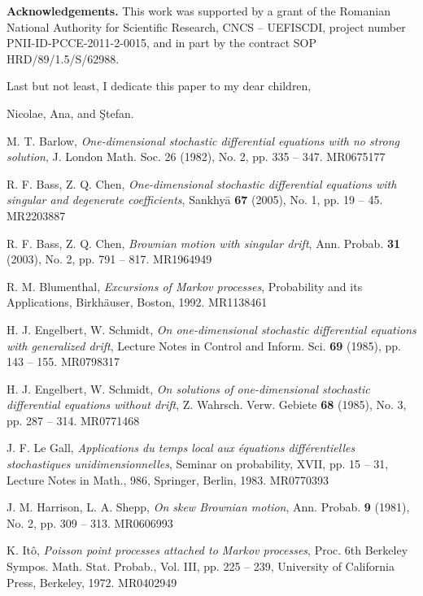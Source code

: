 \documentclass[reqno]{amsart}
\theoremstyle{definition}
\theoremstyle{remark}
\numberwithin{equation}{section}
\begin{document}
{\bf Acknowledgements.} This work was supported by a grant of the Romanian National Authority for Scientific Research, CNCS -- UEFISCDI, project number PNII-ID-PCCE-2011-2-0015, and in part by the contract SOP HRD/89/1.5/S/62988.

Last but not least, I dedicate this paper to my dear children, {\newline\centerline{Nicolae, Ana, and \c{S}tefan.}}

\vspace{1cm}
\begin{thebibliography}{RoVaYo}
 M. T. Barlow, \textit{One-dimensional stochastic differential equations with no strong solution}, J. London Math. Soc. 26 (1982), No. 2, pp. 335 -- 347. MR0675177

 R. F. Bass, Z. Q. Chen, \textit{One-dimensional stochastic differential equations with singular and degenerate coefficients}, Sankhy\={a} \textbf{67} (2005), No. 1, pp. 19 -- 45. MR2203887

 R. F. Bass, Z. Q. Chen, \textit{Brownian motion with singular drift}, Ann. Probab. \textbf{31} (2003), No. 2, pp. 791 -- 817. MR1964949

 R. M. Blumenthal, \textit{Excursions of Markov processes}, Probability and its Applications, Birkh\"{a}user, Boston, 1992. MR1138461

 H. J. Engelbert, W. Schmidt, \textit{On one-dimensional stochastic differential equations with generalized drift}, Lecture Notes in Control and Inform. Sci. \textbf{69} (1985), pp. 143 -- 155. MR0798317
    
 H. J. Engelbert, W. Schmidt, \textit{On solutions of one-dimensional stochastic differential equations without drift}, Z. Wahrsch. Verw. Gebiete \textbf{68} (1985), No. 3, pp. 287 -- 314. MR0771468

 J. F. Le Gall, \textit{Applications du temps local aux \'{e}quations diff\'{e}rentielles stochastiques unidimensionnelles}, Seminar on
probability, XVII, pp. 15 -- 31, Lecture Notes in Math., 986, Springer, Berlin, 1983. MR0770393

 J. M. Harrison, L. A. Shepp, \textit{On skew Brownian motion}, Ann. Probab. \textbf{9} (1981), No. 2, pp. 309 -- 313. MR0606993

 K. It\^{o}, \textit{Poisson point processes attached to Markov processes}, Proc. $6$th Berkeley Sympos. Math. Stat. Probab., Vol. III, pp. 225 -- 239, University of California Press, Berkeley,  1972. MR0402949
    

\end{thebibliography}
\end{document}
